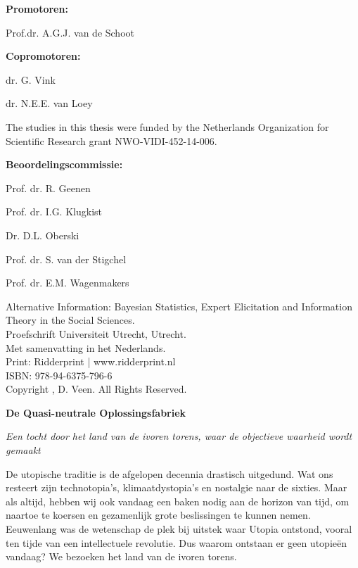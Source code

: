 \newpage

\pagestyle{empty}
\textbf{Promotoren:}


Prof.dr. A.G.J. van de Schoot

\textbf{Copromotoren:}

dr. G. Vink

dr. N.E.E. van Loey

\vspace*{\fill}

\noindent The studies in this thesis were funded by the Netherlands Organization for Scientific Research grant NWO-VIDI-452-14-006.

% 

\newpage


\textbf{Beoordelingscommissie:}

Prof. dr. R. Geenen

Prof. dr. I.G. Klugkist

Dr. D.L. Oberski 

Prof. dr. S. van der Stigchel

Prof. dr. E.M. Wagenmakers 

\vspace*{\fill}


\noindent Alternative Information: Bayesian Statistics, Expert Elicitation and Information Theory in the Social Sciences.\\
\noindent Proefschrift Universiteit Utrecht, Utrecht. \\
\noindent Met samenvatting in het Nederlands. \\

\noindent Print: Ridderprint | www.ridderprint.nl \\
\noindent ISBN: 978-94-6375-796-6 \\
\noindent Copyright , D. Veen. All Rights Reserved.



\newpage

\textbf{De Quasi-neutrale Oplossingsfabriek}

\textit{Een tocht door het land van de ivoren torens, waar de objectieve waarheid wordt gemaakt}

De utopische traditie is de afgelopen decennia drastisch uitgedund. Wat ons resteert zijn technotopia's, klimaatdystopia's en nostalgie naar de sixties. Maar als altijd, hebben wij ook vandaag een baken nodig aan de horizon van tijd, om naartoe te koersen en gezamenlijk grote beslissingen te kunnen nemen. Eeuwenlang was de wetenschap de plek bij uitstek waar Utopia ontstond, vooral ten tijde van een intellectuele revolutie. Dus waarom ontstaan er geen utopieën vandaag? We bezoeken het land van de ivoren torens.

